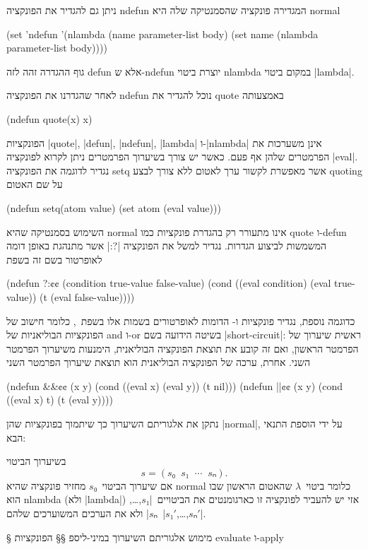 ניתן גם להגדיר את הפונקציה ndefun המגדירה פונקציה שהסמנטיקה שלה היא normal
\begin{LIBRARY}
(set 'ndefun
  '(nlambda (name parameter-list body)
    (set name (nlambda parameter-list body))))
\end{LIBRARY}
גוף ההגדרה זהה לזה defun אלא ש-ndefun יוצרת ביטוי nlambda במקום ביטוי
\E|lambda|.

לאחר שהגדרנו את הפונקציה ndefun נוכל להגדיר את quote באמצעותה
\begin{LISP}
(ndefun quote(x) x)
\end{LISP}
הפונקציות \E|quote|, \E|defun|, \E|ndefun|, \E|lambda| ו-\E|nlambda| אינן
משערכות את הפרמטרים שלהן אף פעם. כאשר יש צורך בשיערוך הפרמטרים ניתן לקרוא
לפונקציה \E|eval|. נגדיר לדוגמה את הפונקציה setq אשר מאפשרת לקשור ערך לאטום ללא
צורך לבצע quoting על שם האטום
\begin{LISP}
(ndefun setq(atom value)
  (set atom (eval value)))
\end{LISP}
השימוש בסמנטיקה שהיא normal אינו מתעורר רק בהגדרת פונקציות כמו quote ו-defun
המשמשות לביצוע הגדרות. נגדיר למשל את הפונקציה \T|?:| אשר מתנהגת באופן דומה
לאופרטור בשם זה בשפת~\CPL
\begin{LISP}
(ndefun ?:¢¢ (condition true-value false-value)
  (cond ((eval condition) (eval true-value))
        (t (eval false-value))))
\end{LISP}
כדוגמה נוספת, נגדיר פונקציות \lisp{||} ו-\lisp{&&} הדומות לאופרטורים בשמות אלו
בשפת~\CPL, כלומר חישוב של הפונקציות הבוליאניות של and ו-or בשיטה הידועה בשם
\E|short-circuit|: ראשית שיערוך של הפרמטר הראשון, ואם זה קובע את תוצאת הפונקציה
הבוליאנית, הימנעות משיערוך הפרמטר השני. אחרת, ערכה של הפונקציה הבוליאנית הוא תוצאת
שיערוך הפרמטר השני
\begin{LISP}
(ndefun &&¢¢ (x y)
  (cond ((eval x) (eval y))
        (t nil)))
(ndefun ||¢¢ (x y)
  (cond ((eval x) t)
        (t (eval y))))
\end{LISP}

נתקן את אלגוריתם השיערוך כך שיתמוך בפונקציות שהן \E|normal|, על ידי הוספת התנאי
הבא:
\begin{mdframed}[backgroundcolor=Lavender!20]
  \footnotesize
  בשיערוך הביטוי \[
    s=(s₀\;\;s₁\;\;⋯\;\;sₙ).
\] אם שיערוך הביטוי~$s₀$ מחזיר פונקציה שהיא
  normal כלומר ביטוי~$λ$ שהאטום הראשון שבו הוא nlambda (ולא \E|lambda|) אזי יש
  להעביר לפונקציה זו כארגומנטים את הביטויים~\E|$s₁$,…,$sₙ$| ולא את הערכים
  המשוערכים שלהם~\E|$s₁'$,…,$sₙ'$|.
\end{mdframed}

§ מימוש אלגוריתם השיערוך במיני-ליספ
§§ הפונקציות evaluate ו-apply

